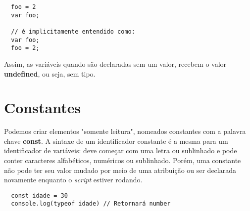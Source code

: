 \begin{lstlisting}
  foo = 2
  var foo;

  // é implicitamente entendido como:
  var foo;
  foo = 2;
\end{lstlisting}

Assim, as variáveis quando são declaradas sem um valor, recebem o valor \textbf{undefined}, ou seja, sem tipo.

\section{Constantes}

Podemos criar elementos "somente leitura", nomeados constantes com a palavra chave \textbf{const}. A sintaxe de um identificador constante é a mesma para um identificador de variáveis: deve começar com uma letra ou sublinhado e pode conter caracteres alfabéticos, numéricos ou sublinhado. Porém, uma constante não pode ter seu valor mudado por meio de uma atribuição ou ser declarada novamente enquanto o \textit{script} estiver rodando.

\begin{lstlisting}
  const idade = 30
  console.log(typeof idade) // Retornará number
\end{lstlisting}
